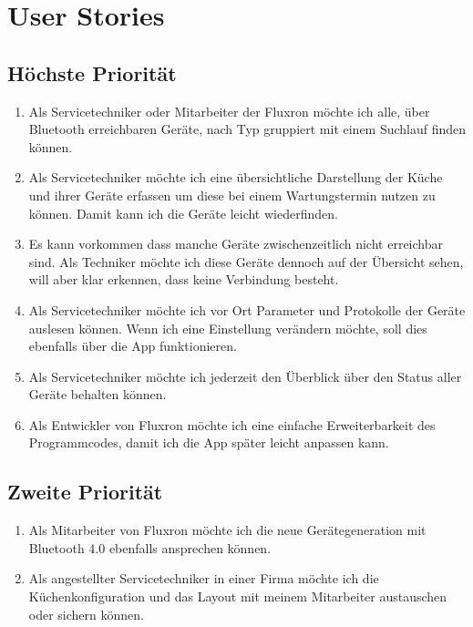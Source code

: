 
\section{User Stories}
\label{sec:User Stories}

\subsection{Höchste Priorität}
\label{subsec:Höchste Priorität}
\begin{enumerate}
\item Als Servicetechniker oder Mitarbeiter der Fluxron möchte ich alle, über Bluetooth erreichbaren Geräte, nach Typ gruppiert mit einem Suchlauf finden können.
\item Als Servicetechniker möchte ich eine übersichtliche Darstellung der Küche und ihrer Geräte erfassen um diese bei einem Wartungstermin nutzen zu können. Damit kann ich die Geräte leicht wiederfinden.
\item Es kann vorkommen dass manche Geräte zwischenzeitlich nicht erreichbar sind. Als Techniker möchte ich diese Geräte dennoch auf der Übersicht sehen, will aber klar erkennen, dass keine Verbindung besteht.
\item Als Servicetechniker möchte ich vor Ort Parameter und Protokolle der Geräte auslesen können. Wenn ich eine Einstellung verändern möchte, soll dies ebenfalls über die App funktionieren.
\item Als Servicetechniker möchte ich jederzeit den Überblick über den Status aller Geräte behalten können.
\item Als Entwickler von Fluxron möchte ich eine einfache Erweiterbarkeit des Programmcodes, damit ich die App später leicht anpassen kann.
\end{enumerate}

\subsection{Zweite Priorität}
\label{subsec:Zweite Priorität}

\begin{enumerate}[resume]
\item Als Mitarbeiter von Fluxron möchte ich die neue Gerätegeneration mit Bluetooth 4.0 ebenfalls ansprechen können.
\item Als angestellter Servicetechniker in einer Firma möchte ich die Küchenkonfiguration und das Layout mit meinem Mitarbeiter austauschen oder sichern können.
\end{enumerate}

